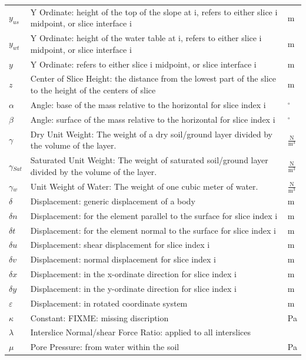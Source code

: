 \documentclass[12pt]{article}
\begin{document}
\begin{longtabu}{l X[l] l}
${y_{us}}$ & Y Ordinate: height of the top of the slope at i, refers to either slice i midpoint, or slice interface i & m
\\
${y_{wt}}$ & Y Ordinate: height of the water table at i, refers to either slice i midpoint, or slice interface i & m
\\
$y$ & Y Ordinate: refers to either slice i midpoint, or slice interface i & m
\\
$z$ & Center of Slice Height: the distance from the lowest part of the slice to the height of the centers of slice & m
\\
$\alpha{}$ & Angle: base of the mass relative to the horizontal for slice index i & ${}^{\circ}$
\\
$\beta{}$ & Angle: surface of the mass relative to the horizontal for slice index i & ${}^{\circ}$
\\
$\gamma{}$ & Dry Unit Weight: The weight of a dry soil/ground layer divided by the volume of the layer. & $\frac{\text{N}}{\text{m}^{3}}$
\\
${\gamma{}_{Sat}}$ & Saturated Unit Weight: The weight of saturated soil/ground layer divided by the volume of the layer. & $\frac{\text{N}}{\text{m}^{3}}$
\\
${\gamma{}_{w}}$ & Unit Weight of Water: The weight of one cubic meter of water. & $\frac{\text{N}}{\text{m}^{3}}$
\\
$\delta{}$ & Displacement: generic displacement of a body & m
\\
$\delta{}n$ & Displacement: for the element parallel to the surface for slice index i & m
\\
$\delta{}t$ & Displacement: for the element normal to the surface for slice index i & m
\\
$\delta{}u$ & Displacement: shear displacement for slice index i & m
\\
$\delta{}v$ & Displacement: normal displacement for slice index i & m
\\
$\delta{}x$ & Displacement: in the x-ordinate direction for slice index i & m
\\
$\delta{}y$ & Displacement: in the y-ordinate direction for slice index i & m
\\
$\varepsilon{}$ & Displacement: in rotated coordinate system & m
\\
$\kappa{}$ & Constant: FIXME: missing discription & Pa
\\
$\lambda{}$ & Interslice Normal/shear Force Ratio: applied to all interslices & 
\\
$\mu{}$ & Pore Pressure: from water within the soil & Pa

\end{longtabu}
\end{document}
